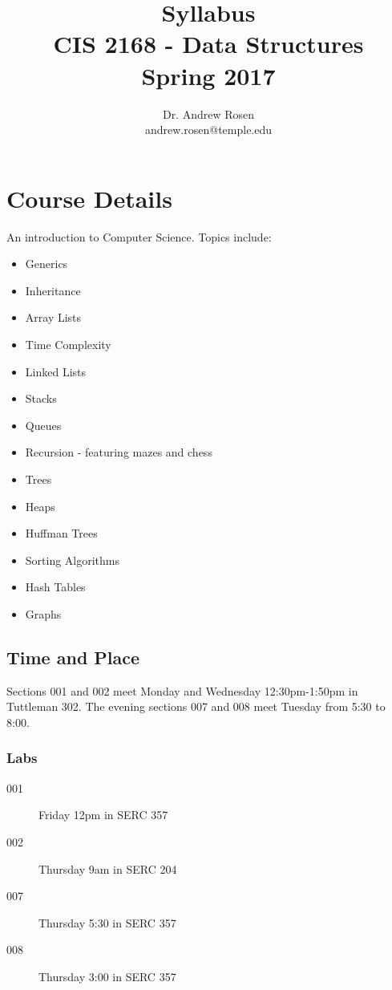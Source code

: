 \documentclass[10pt, letter]{article}
\title{Syllabus \\ CIS 2168 - Data Structures\\ Spring 2017}
\author{Dr. Andrew Rosen  \\ andrew.rosen@temple.edu}
\date{}
\begin{document}
\maketitle

\section{Course Details}

An introduction to Computer Science. Topics include:
\begin{itemize}
	\item Generics
	\item Inheritance
	\item Array Lists
	\item Time Complexity
	\item Linked Lists
	\item Stacks
	\item Queues
	\item Recursion - featuring mazes and chess
	\item Trees
	\item Heaps
	\item Huffman Trees
	\item Sorting Algorithms
	\item Hash Tables
	\item Graphs
\end{itemize}




\subsection*{Time and Place}
Sections 001 and 002 meet Monday and Wednesday 12:30pm-1:50pm in Tuttleman 302.
The evening sections 007 and 008 meet Tuesday from 5:30 to 8:00.


\subsubsection*{Labs}
\begin{description}
\item[001] Friday 12pm in SERC 357
\item[002] Thursday 9am in SERC 204
\item[007] Thursday 5:30 in SERC 357
\item[008] Thursday 3:00 in SERC 357
\end{description}
\end{document}
